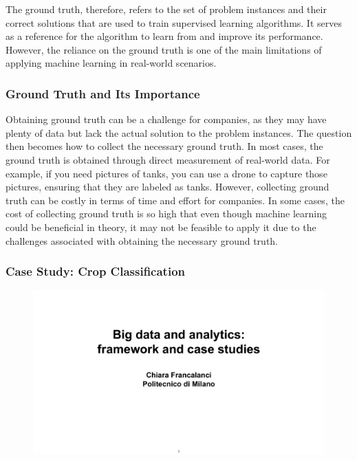 The ground truth, therefore, refers to the set of problem instances and
their correct solutions that are used to train supervised learning
algorithms. It serves as a reference for the algorithm to learn from and
improve its performance. However, the reliance on the ground truth is
one of the main limitations of applying machine learning in real-world
scenarios.


\subsubsection{Ground Truth and Its
    Importance}\label{ground-truth-and-its-importance}

Obtaining ground truth can be a challenge for companies, as they may
have plenty of data but lack the actual solution to the problem
instances. The question then becomes how to collect the necessary ground
truth. In most cases, the ground truth is obtained through direct
measurement of real-world data. For example, if you need pictures of
tanks, you can use a drone to capture those pictures, ensuring that they
are labeled as tanks. However, collecting ground truth can be costly in
terms of time and effort for companies. In some cases, the cost of
collecting ground truth is so high that even though machine learning
could be beneficial in theory, it may not be feasible to apply it due to
the challenges associated with obtaining the necessary ground truth.


\subsubsection{Case Study: Crop
    Classification}\label{case-study-crop-classification}

\begin{figure}[!h]
    \centering
    \includegraphics[page=7, trim = 1.5cm 1cm 1.5cm 4.8cm, clip, width=\textwidth]{images/06 - BIG_DATA.pdf}
\end{figure}

